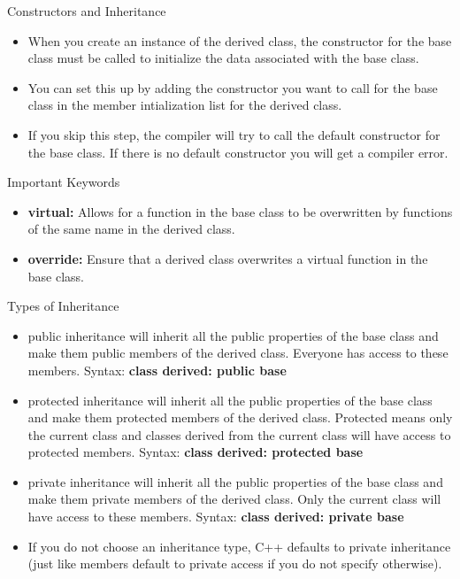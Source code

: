 \documentclass{beamer}
\begin{document}
\begin{frame}{Constructors and Inheritance}
    \begin{itemize}
        \item When you create an instance of the derived class, the constructor for the base class
        must be called to initialize the data associated with the base class.
        \item You can set this up by adding the constructor you want to call for the base class in
        the member intialization list for the derived class.
        \item If you skip this step, the compiler will try to call the default constructor for the base class. 
        If there is no default constructor you will get a compiler error.  
    \end{itemize}
\end{frame}



\begin{frame}{Important Keywords}
    \begin{itemize}
    \item \textbf{virtual:} Allows for a function in the base class to be overwritten by
    functions of the same name in the derived class. 
    \item \textbf{override:} Ensure that a derived class overwrites a virtual function in the base class. 
    \end{itemize}  
    \end{frame}
    

\begin{frame}{Types of Inheritance}
    \begin{itemize}
        \item public inheritance will inherit all the public properties of the base class 
        and make them public members of the derived class. Everyone has access to these members. 
        Syntax: \textbf{class derived: public base}
        \item protected inheritance will inherit all the public properties of the base class 
        and make them protected members of the derived class. Protected means only the current class 
        and classes derived from the current class will have access to protected members.
        Syntax: \textbf{class derived: protected base}
        \item private inheritance will inherit all the public properties of the base class 
        and make them private members of the derived class. Only the current class will
        have access to these members. Syntax: \textbf{class derived: private base}   
        \item If you do not choose an inheritance type, C++ defaults to private inheritance 
        (just like members default to private access if you do not specify otherwise). 
    \end{itemize}
\end{frame}
\end{document}
